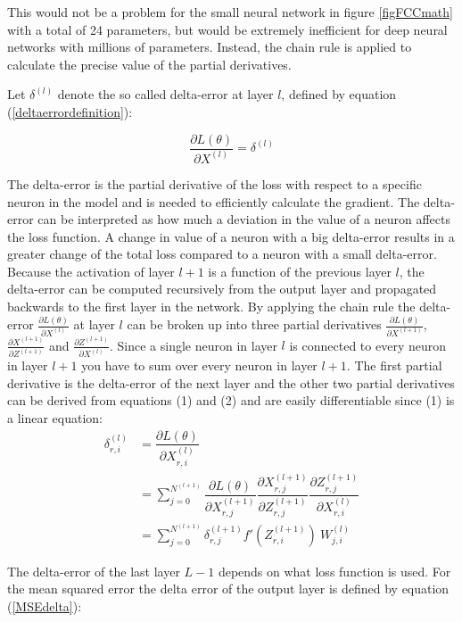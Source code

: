 \documentclass[a4paper,11pt,twoside]{article}
\newcommand*{\pd}[2]{\ensuremath{\dfrac{\partial #1}{\partial #2}}}
\newcommand*{\inpd}[2]{\ensuremath{\frac{\partial #1}{\partial #2}}}
\begin{document}
This would not be a problem for the small neural network in figure \ref{figFCCmath} with a total of 24 parameters, but would be extremely inefficient for deep neural networks with millions of parameters. Instead, the chain rule is applied to calculate the precise value of the partial derivatives. \cite{cs231n}

Let $\delta^{(l)}$ denote the so called delta-error at layer $l$, defined by equation (\ref{deltaerrordefinition}):

\begin{equation}\label{deltaerrordefinition}
\inpd{L(\theta)}{X^{(l)}} = \delta^{(l)}
\end{equation}

The delta-error is the partial derivative of the loss with respect to a specific neuron in the model and is needed to efficiently calculate the gradient. The delta-error can be interpreted as how much a deviation in the value of a neuron affects the loss function. A change in value of a neuron with a big delta-error results in a greater change of the total loss compared to a neuron with a small delta-error. Because the activation of layer $l+1$ is a function of the previous layer $l$, the delta-error can be computed recursively from the output layer and propagated backwards to the first layer in the network. By applying the chain rule the delta-error $\inpd{L(\theta)}{X^{(l)}}$  at layer $l$ can be broken up into three partial derivatives $\inpd{L(\theta)}{X^{(l+1)}}$, $\inpd{X^{(l+1)}}{Z^{(l+1)}}$ and $\inpd{Z^{(l+1)}}{X^{(l)}}$. Since a single neuron in layer $l$ is connected to every neuron in layer $l+1$ you have to sum over every neuron in layer $l+1$. The first partial derivative is the delta-error of the next layer and the other two partial derivatives can be derived from equations (1) and (2) and are easily differentiable since (1) is a linear equation: \cite{cs231n} \cite{wikiStanford}
\begin{equation}\label{dLdX_FCC}
\begin{split}
\delta^{(l)}_{r,i}
	& = \pd{L(\theta)}{X^{(l)}_{r,i}}  \\
	& = \sum^{N^{(l+1)}}_{j=0} \pd{L(\theta)}{X^{(l+1)}_{r,j}} \pd{X^{(l+1)}_{r,j}}{Z^{(l+1)}_{r,j}} \pd{Z^{(l+1)}_{r,j}}{X^{(l)}_{r,i}} \\
	& = \sum^{N^{(l+1)}}_{j=0} \delta^{(l+1)}_{r,j} f'(Z^{(l+1)}_{r,i}) \ W^{(l)}_{j,i} 
\end{split}
\end{equation}

The delta-error of the last layer $L-1$ depends on what loss function is used. For the mean squared error the delta error of the output layer is defined by equation (\ref{MSEdelta}): \cite{cs231n} \cite{wikiStanford}
\end{document}
